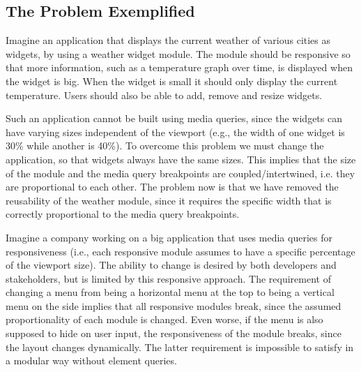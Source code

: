 \documentclass{acm_proc_article-sp}
\begin{document}
  \subsection{The Problem Exemplified}
    
    Imagine an application that displays the current weather of various cities as widgets, by using a weather widget module.
    The module should be responsive so that more information, such as a temperature graph over time, is displayed when the widget is big.
    When the widget is small it should only display the current temperature.
    Users should also be able to add, remove and resize widgets.

    Such an application cannot be built using media queries, since the widgets can have varying sizes independent of the viewport (e.g., the width of one widget is 30\% while another is 40\%).
    To overcome this problem we must change the application, so that widgets always have the same sizes.
    This implies that the size of the module and the media query breakpoints are coupled/intertwined, i.e. they are proportional to each other.
    The problem now is that we have removed the reusability of the weather module, since it requires the specific width that is correctly proportional to the media query breakpoints. 

    Imagine a company working on a big application that uses media queries for responsiveness (i.e., each responsive module assumes to have a specific percentage of the viewport size).
    The ability to change is desired by both developers and stakeholders, but is limited by this responsive approach.
    The requirement of changing a menu from being a horizontal menu at the top to being a vertical menu on the side implies that all responsive modules break, since the assumed proportionality of each module is changed.
    Even worse, if the menu is also supposed to hide on user input, the responsiveness of the module breaks, since the layout changes dynamically.
    The latter requirement is impossible to satisfy in a modular way without element queries.
\end{document}

